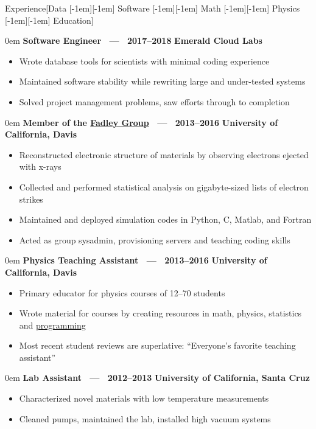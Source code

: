 \documentclass[11pt,a4paper]{article}
\newenvironment{headedsection}[2]{
    \begin{addmargin}[0.5em]{0em}
    {\large\bfseries #1} \hfill {\bfseries #2}%
    \begin{itemize}
        [label={}, topsep=0pt, itemsep=1.5pt, parsep=0pt, leftmargin=1.5em]
}{
    \end{itemize}
    \end{addmargin}
    \medskip
}
\newcommand*\sbull{\raisebox{-0.550ex}[-1em][-1em]{\textscale{4}{\( \cdot \)}}\xspace}
\begin{document}
\sloppy  %


\vspace{1em}

\begin{mysection}{Experience}[Data \sbull{} Software \sbull{} Math \sbull{} Physics \sbull{} Education]

    \begin{headedsection}{Software Engineer \ --- \ 2017--2018}{Emerald Cloud Labs}
        \item Wrote database tools for scientists with minimal coding experience
        \item Maintained software stability while rewriting large and under-tested systems
        \item Solved project management problems, saw efforts through to completion
    \end{headedsection}

\begin{headedsection}
          {Member of the \href{http://www.physics.ucdavis.edu/fadleygroup/}{Fadley Group} \ --- \ 2013--2016}
          {University of California, Davis}

        \item Reconstructed electronic structure of materials by observing electrons ejected with x-rays
        \item Collected and performed statistical analysis on gigabyte-sized lists of electron strikes
        \item Maintained and deployed simulation codes in Python, C, Matlab, and Fortran
        \item Acted as group sysadmin, provisioning servers and teaching coding skills
    \end{headedsection}

    \begin{headedsection}
          {Physics Teaching Assistant  \ --- \ 2013--2016}
          {University of California, Davis}

        \item Primary educator for physics courses of 12--70 students
        \item Wrote material for courses by creating resources in math, physics, statistics and \href{https://github.com/jgarst/AdvancedLab/releases/download/spring_2016/Python-FirstSteps.pdf}{programming}
        \item Most recent student reviews are superlative: ``Everyone's favorite teaching assistant''
    \end{headedsection}

    \begin{headedsection}
          {Lab Assistant \ --- \ 2012--2013}
          {University of California, Santa Cruz}

        \item Characterized novel materials with low temperature measurements
        \item Cleaned pumps, maintained the lab, installed high vacuum systems
    \end{headedsection}
\end{mysection}
\end{document}

